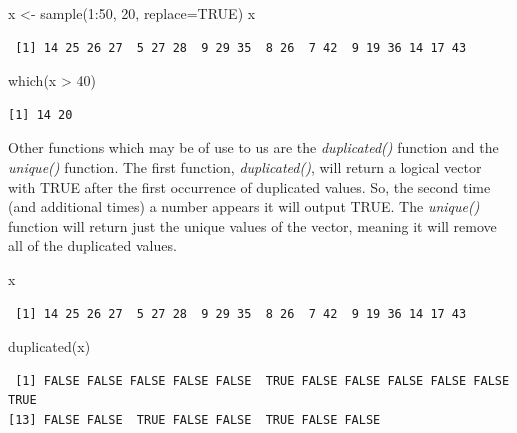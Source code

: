 \documentclass[
  letterpaper,
  DIV=11,
  numbers=noendperiod]{scrreprt}
\newenvironment{Shaded}{\begin{snugshade}}{\end{snugshade}}
\newcommand{\AttributeTok}[1]{\textcolor[rgb]{0.40,0.45,0.13}{#1}}
\newcommand{\ConstantTok}[1]{\textcolor[rgb]{0.56,0.35,0.01}{#1}}
\newcommand{\DecValTok}[1]{\textcolor[rgb]{0.68,0.00,0.00}{#1}}
\newcommand{\FunctionTok}[1]{\textcolor[rgb]{0.28,0.35,0.67}{#1}}
\newcommand{\NormalTok}[1]{\textcolor[rgb]{0.00,0.23,0.31}{#1}}
\newcommand{\OtherTok}[1]{\textcolor[rgb]{0.00,0.23,0.31}{#1}}
\newcommand{\SpecialCharTok}[1]{\textcolor[rgb]{0.37,0.37,0.37}{#1}}
\begin{document}
\begin{Shaded}
\begin{Highlighting}[]
\NormalTok{x }\OtherTok{\textless{}{-}} \FunctionTok{sample}\NormalTok{(}\DecValTok{1}\SpecialCharTok{:}\DecValTok{50}\NormalTok{, }\DecValTok{20}\NormalTok{, }\AttributeTok{replace=}\ConstantTok{TRUE}\NormalTok{)}
\NormalTok{x}
\end{Highlighting}
\end{Shaded}

\begin{verbatim}
 [1] 14 25 26 27  5 27 28  9 29 35  8 26  7 42  9 19 36 14 17 43
\end{verbatim}

\begin{Shaded}
\begin{Highlighting}[]
\FunctionTok{which}\NormalTok{(x }\SpecialCharTok{\textgreater{}} \DecValTok{40}\NormalTok{)}
\end{Highlighting}
\end{Shaded}

\begin{verbatim}
[1] 14 20
\end{verbatim}

Other functions which may be of use to us are the \emph{duplicated()}
function and the \emph{unique()} function. The first function,
\emph{duplicated()}, will return a logical vector with TRUE after the
first occurrence of duplicated values. So, the second time (and
additional times) a number appears it will output TRUE. The
\emph{unique()} function will return just the unique values of the
vector, meaning it will remove all of the duplicated values.

\begin{Shaded}
\begin{Highlighting}[]
\NormalTok{x}
\end{Highlighting}
\end{Shaded}

\begin{verbatim}
 [1] 14 25 26 27  5 27 28  9 29 35  8 26  7 42  9 19 36 14 17 43
\end{verbatim}

\begin{Shaded}
\begin{Highlighting}[]
\FunctionTok{duplicated}\NormalTok{(x)}
\end{Highlighting}
\end{Shaded}

\begin{verbatim}
 [1] FALSE FALSE FALSE FALSE FALSE  TRUE FALSE FALSE FALSE FALSE FALSE  TRUE
[13] FALSE FALSE  TRUE FALSE FALSE  TRUE FALSE FALSE
\end{verbatim}
\end{document}
